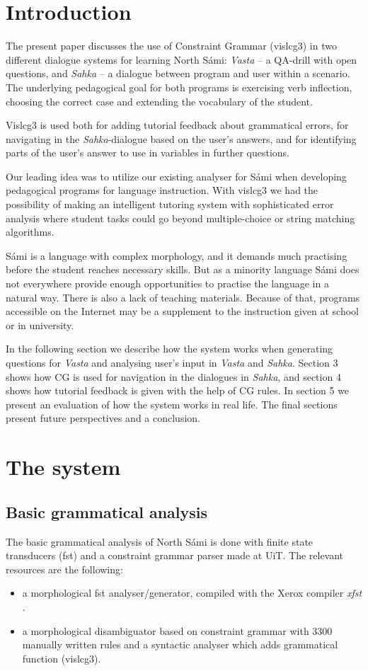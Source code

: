\documentclass[11pt]{article}
\begin{document}
\section{Introduction} 

The present paper discusses the use of Constraint Grammar (vislcg3) in two different dialogue systems for learning North Sámi: \textit{Vasta} -- a QA-drill with open questions, and \textit{Sahka} -- a  dialogue between program and user within a scenario. The underlying pedagogical goal for both programs is exercising verb inflection, choosing the correct case and extending the vocabulary of the student. 

Vislcg3 is used both for adding tutorial feedback about grammatical errors, for navigating in the \textit{Sahka}-dialogue based on the user's answers, and for identifying parts of the user's answer to use in variables in further questions. 

Our leading idea was to utilize our existing analyser for Sámi when developing pedagogical programs for language instruction. With vislcg3 we had the possibility of making an intelligent tutoring system with sophisticated error analysis where student tasks could go beyond multiple-choice or string matching algorithms. 

Sámi is a language with complex morphology, and it demands much practising before the student reaches necessary skills. But as a minority language Sámi does not everywhere provide enough opportunities to practise the language in a natural way. There is also a lack of teaching materials. Because of that, programs accessible on the Internet may be a supplement to the instruction given at school or in university. 

In the following section we describe how the system works when generating questions for \textit{Vasta} and analysing user's input in \textit{Vasta} and \textit{Sahka}. Section 3 shows how CG is used for navigation in the dialogues in \textit{Sahka}, and section 4 shows how tutorial feedback is given with the help of CG rules. In section 5 we present an evaluation of how the system works in real life. The final sections present future perspectives and a conclusion.

\section{The system}
\subsection{Basic grammatical analysis}
The basic grammatical analysis of North Sámi is done with finite state transducers (fst) and a constraint grammar parser made at UiT. The relevant resources are the following:
\begin{itemize}
\item a morphological fst analyser/generator, compiled with the Xerox compiler \textit{xfst} \cite{BeesleyKarttunen:03}.  
\item a morphological disambiguator based on constraint grammar with 3300 manually written rules and a syntactic analyser which adds grammatical function (vislcg3). 
\end{itemize} 
\end{document}
